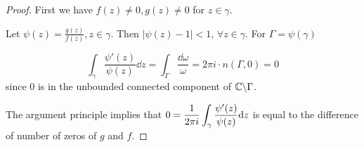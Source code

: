\begin{proof}
    First we have  $ f(z)\neq0,g(z)\neq 0 $ for  $ z\in \gamma $.
    
    Let  $ \psi(z)=\frac{g(z)}{f(z)},z\in\gamma$. Then  $ |\psi(z)-1|<1,\,\forall z\in \gamma  $. For  $ \Gamma=\psi(\gamma) $ 
    
    \[\int_\gamma\frac{\psi'(z)}{\psi(z)}\dd z=\int_\Gamma\frac{\dd \omega }{\omega}=2\pi i \cdot n(\Gamma,0)=0\]
    since  $ 0 $ is in the unbounded connected component of  $ \mathbb C\backslash \Gamma $.
    
    The argument principle implies that  $ 0=\displaystyle\frac{1 }{2\pi i}\int_\gamma\frac{\psi'(z)}{\psi(z)}\mathrm{d} z $ is equal to the difference of number of zeros of  $ g   $ and  $ f $.  
\end{proof}
